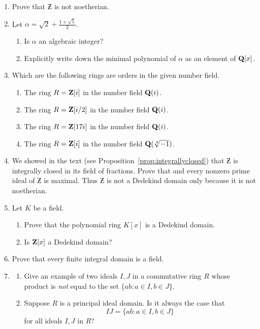 \begin{enumerate}
\item Prove that $\Zbar$ is not noetherian.


\item Let $\alpha = \sqrt{2} + \frac{1+\sqrt{5}}{2}$. 
\begin{enumerate}
\item Is $\alpha$ an algebraic integer?
\item Explicitly write down the minimal polynomial of $\alpha$
as an element of $\mathbf{Q}[x]$.
\end{enumerate}

\item Which are the following rings are orders in the given
number field.
\begin{enumerate}
\item The ring $R = \mathbf{Z}[i]$ in the number field $\mathbf{Q}(i)$.
\item The ring $R = \mathbf{Z}[i/2]$ in the number field $\mathbf{Q}(i)$.
\item The ring $R = \mathbf{Z}[17i]$ in the number field $\mathbf{Q}(i)$.
\item The ring $R = \mathbf{Z}[i]$ in the number field $\mathbf{Q}(\sqrt[4]{-1})$.
\end{enumerate}



\item We showed in the text (see
  Proposition~\ref{prop:integrallyclosed}) that $\Zbar$ is integrally
  closed in its field of fractions.  Prove that and every nonzero
  prime ideal of $\Zbar$ is maximal.  Thus $\Zbar$ is not a Dedekind
  domain only because it is not noetherian.

\item Let $K$ be a field.  
\begin{enumerate}
\item Prove that the polynomial ring $K[x]$
is a Dedekind domain.
\item Is $\mathbf{Z}[x]$ a Dedekind domain?
\end{enumerate}

\item \label{ex:finitedomain} 
Prove that every finite integral domain is a field.

\item \label{ex:idealprod} 
\begin{enumerate}
\item Give an example of two ideals $I, J$ in a
commutative ring $R$ whose product is {\em not} equal to the set
$\{ab : a \in I, b \in J\}$. 
\item Suppose $R$ is a principal ideal domain.   
Is it always the case that 
$$ 
IJ = \{ab : a \in I, b \in J\}
$$
for all ideals $I, J$ in $R$?
\end{enumerate}


\end{enumerate}
